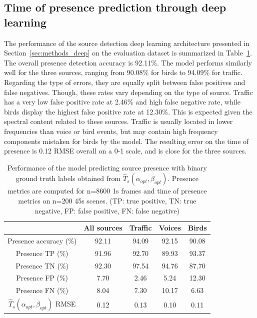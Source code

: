 \documentclass[11pt,a4paper]{article}
\begin{document}
\subsection{Time of presence prediction through deep learning}
\label{sec:results_deep}

The performance of the source detection deep learning architecture presented in Section~\ref{sec:methods_deep} on the evaluation dataset is summarized in Table~\ref{tab:perf_cmp}. The overall presence detection accuracy is 92.11\%. The model performs similarly well for the three sources, ranging from 90.08\% for birds to 94.09\% for traffic. Regarding the type of errors, they are equally split between false positives and false negatives. Though, these rates vary depending on the type of source. Traffic has a very low false positive rate at 2.46\% and high false negative rate, while birds display the highest false positive rate at 12.30\%. This is expected given the spectral content related to these sources. Traffic is usually located in lower frequencies than voice or bird events, but may contain high frequency components mistaken for birds by the model. The resulting error on the time of presence is 0.12 RMSE overall on a 0-1 scale, and is close for the three sources.


\begin{table}[t]
\centering
\caption{Performance of the model predicting source presence with binary ground truth labels obtained from $\hat T_s(\alpha_{opt}, \beta_{opt})$. Presence metrics are computed for n=8600 1s frames and time of presence metrics on n=200 45s scenes. (TP: true positive, TN: true negative, FP: false positive, FN: false negative)}
\label{tab:perf_cmp}
\begin{tabular}{ c | c | c c c }
\hline
	 & All sources & Traffic & Voices & Birds \\ \hline
	Presence accuracy (\%) &  92.11 & 94.09 & 92.15 & 90.08 \\
	Presence TP (\%) & 91.96 & 92.70 & 89.93 & 93.37 \\
	Presence TN (\%) & 92.30 & 97.54 & 94.76 & 87.70 \\
	Presence FP (\%) & 7.70 & 2.46 & 5.24 & 12.30 \\
	Presence FN (\%) & 8.04 & 7.30 & 10.17 & 6.63 \\ \hline
	$\hat T_s(\alpha_{opt}, \beta_{opt})$ RMSE & 0.12 & 0.13 & 0.10 & 0.11 \\
\end{tabular}
\end{table}
\end{document}
